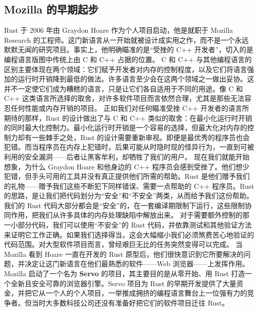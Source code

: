 \subsection{Mozilla 的早期起步}
\label{idx:idx_b6a784b3}
Rust 于 2006 年由 Graydon Hoare 作为个人项目启动，他是就职于 Mozilla Research 的工程师。这门新语言从一开始就被设计成实用之作，而不是一个永远默默无闻的研究项目。事实上，他明确瞄准的是“受挫的 C++ 开发者”，切入的是编程语言版图中传统上由 C 和 C++ 占据的位置。
C 和 C++ 与其他编程语言的区别主要体现在两个领域：它们赋予开发者对内存的控制程度，以及它们将语言强加的运行时开销降到最低的做法。许多语言至少会在这两个领域之一做出妥协。这并不一定使它们成为糟糕的语言，只是让它们各自适用于不同的用途。像 C 和 C++ 这类语言所选择的取舍，对许多软件项目而言依然合理，尤其是那些无法容忍任何性能或内存开销的项目。
正如我们对任何瞄准受挫 C++ 开发者的语言所期待的那样，Rust 的设计做出了与 C 和 C++ 类似的取舍：在最小化运行时开销的同时最大化控制力。最小化运行时开销是一个容易的选择，但最大化对内存的控制力却有一些棘手之处，Rust 的设计需要重新审视。即便是最优秀的程序员也会犯错。而当程序员在内存上犯错时，后果可能从时隐时现的怪异行为，一直到可被利用的安全漏洞——后者让黑客牟利，却牺牲了我们的用户。
现在我们就能开始想象，为什么 Graydon Hoare 和他身边的 C++ 程序员会感到受挫了。他们想少犯错，但手头可用的工具并没有真正提供他们所需的帮助。Rust 是他们赠予我们的礼物——赠予我们这些不断犯下同样错误、需要一点帮助的 C++ 程序员。Rust 的思路，是让我们把代码划分为“安全”和“不安全”两类，从而给予我们这份帮助。我们的 Rust 代码大部分都会是“安全”的，在一套编译期限制下运行，这些限制协同作用，把我们从许多具体的内存处理缺陷中解放出来。
对于需要额外控制的那一小部分代码，我们可以使用“不安全”的 Rust 代码，并依靠测试和其他验证方法来证明它工作正确。如果我们选择得当，这会大幅缩小我们必须煞费苦心地验证的代码范围。对大型软件项目而言，曾经艰巨无比的任务突然变得可以完成。
\label{idx:idx_750b6958}
\label{idx:idx_aed0c55d}
当 Mozilla 看到 Hoare 一直在开发的 Rust 原型后，他们很快意识到它所要解决的问题，并决定让这门新语言在他们最熟悉的软件——Web 浏览器——上发挥作用。Mozilla 启动了一个名为 \textbf{Servo} 的项目，其主要目的是从零开始、用 Rust 打造一个全新且安全可靠的浏览器引擎。Servo 项目为 Rust 的早期开发提供了大量资金，并把它从一个人的个人项目，一举推成拥挤的编程语言舞台上一位强有力的竞争者。但当时大多数科技公司还没有准备好把它们的软件项目迁往 Rust。
